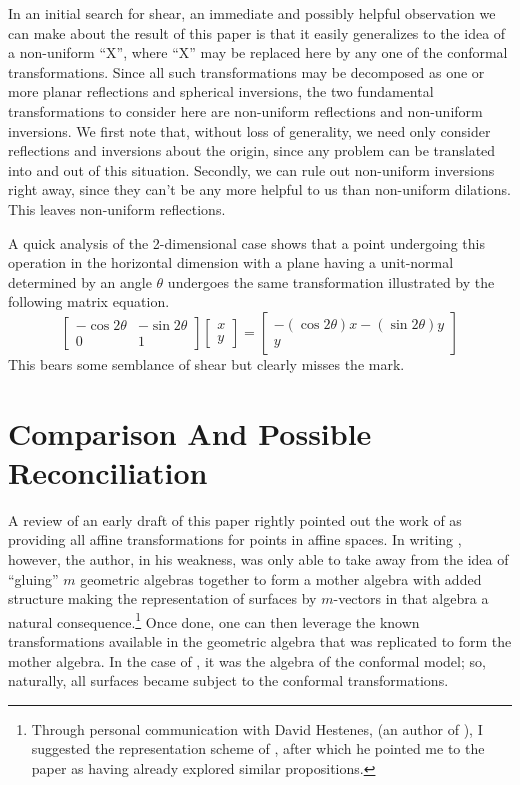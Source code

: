 \documentclass{birkjour}
\theoremstyle{definition}
\theoremstyle{remark}
\numberwithin{equation}{section}
\begin{document}
In an initial search for shear, an immediate and possibly helpful observation we can make about the result of this paper is that it
easily generalizes to the idea of a non-uniform ``X'', where ``X'' may be replaced here
by any one of the conformal transformations.  Since all such transformations may be
decomposed as one or more planar reflections and spherical inversions, the two fundamental
transformations to consider here are non-uniform reflections and non-uniform inversions.
We first note that, without loss of generality, we need only consider reflections and inversions
about the origin, since any problem can be translated into and out of this situation.
Secondly, we can rule out non-uniform inversions right away, since they can't be any more helpful
to us than non-uniform dilations.  This leaves non-uniform reflections.

A quick analysis of the 2-dimensional case shows that a point undergoing this operation
in the horizontal dimension with a plane having a unit-normal determined by an angle $\theta$ undergoes the same
transformation illustrated by the following matrix equation.
\begin{equation*}
\left[\begin{array}{cc} -\cos 2\theta & -\sin 2\theta \\ 0 & 1 \end{array}\right]
\left[\begin{array}{c} x \\ y \end{array}\right] =
\left[\begin{array}{c} -(\cos 2\theta)x - (\sin 2\theta)y \\ y \end{array}\right]
\end{equation*}
This bears some semblance of shear but clearly misses the mark.

\section{Comparison And Possible Reconciliation}

A review of an early draft of this paper rightly pointed out the work of \cite{DoranHestenes93} as providing
all affine transformations for points in affine spaces.
In writing \cite{Parkin13}, however, the author, in his weakness, was only able to take away from \cite{DoranHestenes93}
the idea of ``gluing'' $m$ geometric algebras together to form a mother algebra
with added structure making the representation of surfaces by $m$-vectors in
that algebra a natural consequence.\footnote{Through personal communication
with David Hestenes, (an author of \cite{DoranHestenes93}), I suggested the representation scheme of \cite{Parkin13}, after which he pointed me
to the paper \cite{DoranHestenes93} as having already explored similar propositions.}  Once done, one can then leverage the known transformations
available in the geometric algebra that was replicated to form the mother algebra.
In the case of \cite{Parkin13}, it was the algebra of the conformal model; so, naturally, all surfaces
became subject to the conformal transformations.
\end{document}
